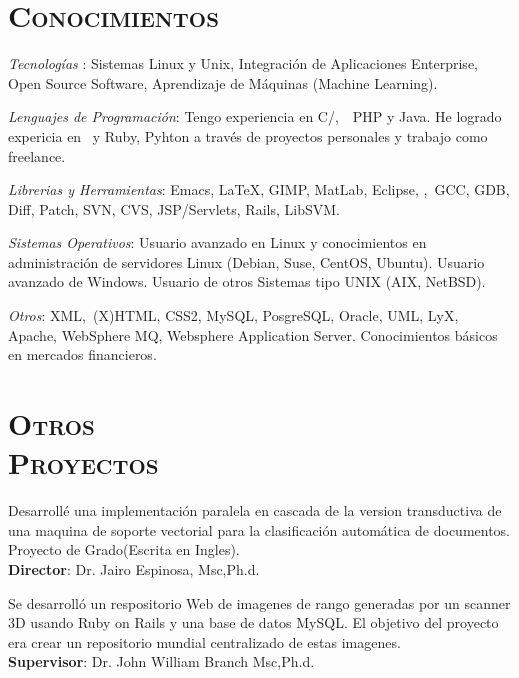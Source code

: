 \begin{resume}

\section{\textsc{Conocimientos}}

\emph{Tecnolog\'{i}as }: Sistemas Linux y Unix, Integraci\'{o}n de
Aplicaciones Enterprise, Open Source Software, Aprendizaje de
M\'{a}quinas (Machine Learning).


\emph{Lenguajes de Programaci\'{o}n}: Tengo experiencia en
C/\Cplusplus,\ \ PHP y Java. He logrado expericia en
\ \CSharp y Ruby, Pyhton a trav\'{e}s de proyectos
personales y trabajo como freelance.

\emph{Librerias y Herramientas}: Emacs, \LaTeX, GIMP, MatLab, Eclipse, \GTKSharp,\ GCC, GDB, Diff, Patch, SVN, CVS, JSP/Servlets, Rails, LibSVM.

\emph{Sistemas Operativos}: Usuario avanzado en Linux  y conocimientos en
administraci\'{o}n de servidores Linux (Debian, Suse, CentOS, Ubuntu). Usuario avanzado de Windows. Usuario de
otros Sistemas tipo UNIX (AIX, NetBSD).

\emph{Otros}: XML,\ (X)HTML, CSS2, MySQL, PosgreSQL, Oracle,
UML, LyX, Apache, WebSphere MQ, Websphere Application
Server. Conocimientos b\'{a}sicos en mercados financieros.


\section{\textsc{Otros\\  Proyectos}}

\begin{position}
Desarroll\'{e} una implementaci\'{o}n  paralela en cascada de la version transductiva de una maquina de soporte vectorial
para la clasificaci\'{o}n autom\'{a}tica de documentos. Proyecto de Grado(Escrita en Ingles).\\
\textbf{Director}:  Dr. Jairo Espinosa, Msc,Ph.d.
\end{position}

\begin{position}
 Se desarroll\'{o} un respositorio Web de imagenes de rango generadas por un scanner 3D  usando Ruby on Rails y una base de datos MySQL.
El objetivo del proyecto era crear un repositorio mundial centralizado de estas imagenes. \\
 \textbf{Supervisor}: Dr. John William Branch Msc,Ph.d.
\end{position}


\end{resume}
